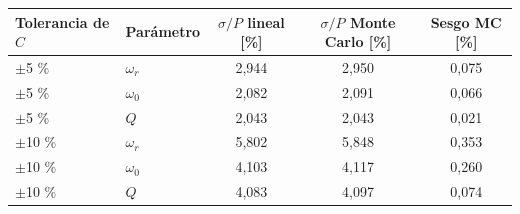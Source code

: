 \begin{tabular}{@{}llccc@{}}
\toprule
Tolerancia de $C$ & Parámetro & $\sigma/P$ lineal [\%] & $\sigma/P$ Monte Carlo [\%] & Sesgo MC [\%] \\
\midrule
$\pm$5 \% & $\omega_r$ & 2{,}944 & 2{,}950 & 0{,}075 \\
$\pm$5 \% & $\omega_0$ & 2{,}082 & 2{,}091 & 0{,}066 \\
$\pm$5 \% & $Q$ & 2{,}043 & 2{,}043 & 0{,}021 \\
$\pm$10 \% & $\omega_r$ & 5{,}802 & 5{,}848 & 0{,}353 \\
$\pm$10 \% & $\omega_0$ & 4{,}103 & 4{,}117 & 0{,}260 \\
$\pm$10 \% & $Q$ & 4{,}083 & 4{,}097 & 0{,}074 \\
\bottomrule
\end{tabular}